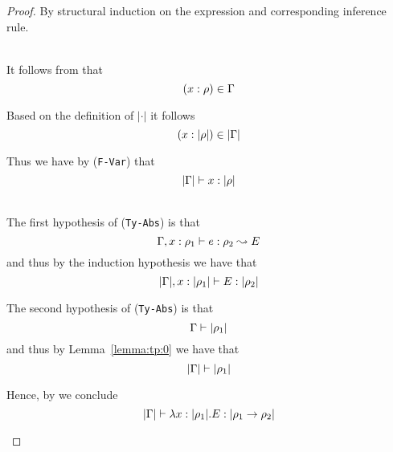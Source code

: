 \begin{proof}
By structural induction on the expression and corresponding inference rule.
\begin{description}
\renewcommand{\itemsep}{10mm}
\item[\fbox{\texttt{(Ty-Var)}}\quad$\tenv \turns x : \rulet \leadsto x$] \ \\

 It follows from  that 
\begin{equation*} 
    (x : \rho) \in \Gamma
\end{equation*} 

Based on the definition of $|\cdot|$  it follows 
\begin{equation*} 
   (x : |\rho|) \in |\Gamma| 
\end{equation*} 

Thus we have by (\texttt{F-Var}) that
\begin{equation*} 
   |\Gamma| \vdash x : |\rho|
\end{equation*} 

\item[\fbox{\texttt{(Ty-Abs)}}\quad$\tenv \turns \lambda x:\rho_1.e : \rho_1 \rightarrow \rho_2 \leadsto \lambda x:|\rho_1|.E$] \ \\

  The first hypothesis of (\texttt{Ty-Abs}) is that
\begin{equation*} 
    \Gamma, x : \rho_1 \vdash e : \rho_2 \leadsto E
\end{equation*} 
  and thus by the induction hypothesis we have that
\begin{equation*} 
    |\Gamma|, x : |\rho_1| \vdash E : |\rho_2|
\end{equation*} 

  The second hypothesis of (\texttt{Ty-Abs}) is that
\begin{equation*} 
    \Gamma \vdash |\rho_1|
\end{equation*} 
  and thus by Lemma~\ref{lemma:tp:0} we have that
\begin{equation*} 
    |\Gamma| \vdash |\rho_1|
\end{equation*} 

  Hence, by  we conclude 
\begin{equation*} 
    |\Gamma| \vdash \lambda x:|\rho_1|.E : |\rho_1 \rightarrow \rho_2|
\end{equation*} 


\end{description}
\end{proof}
